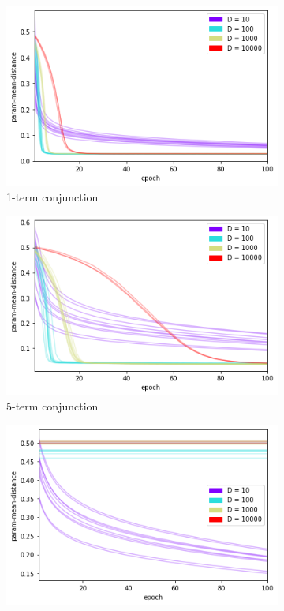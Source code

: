 \begin{figure}[h]
    \centering
    \begin{subfigure}[b]{0.30\textwidth}
        \centering
        \includegraphics[width=\textwidth]{imgs/conj-pmd-prod-keep50-1t.png}
        \caption{1-term conjunction}
        \label{fig:conjconvkeepn1}
    \end{subfigure}
    \begin{subfigure}[b]{0.30\textwidth}
        \centering
        \includegraphics[width=\textwidth]{imgs/conj-pmd-prod-keep50-5t.png}
        \caption{5-term conjunction}
        \label{fig:conjconvkeepn5}
    \end{subfigure}
    \begin{subfigure}[b]{0.30\textwidth}
        \centering
        \includegraphics[width=\textwidth]{imgs/conj-pmd-prod-keep50-20t.png}

\end{subfigure}
\end{figure}
